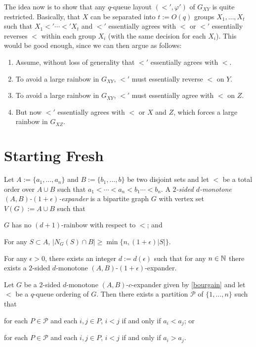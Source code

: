 \documentclass{patmorin}
\begin{document}
The idea now is to show that any $q$-queue layout $(<',\varphi')$ of $G_{XY}$ is quite restricted.  Basically, that $X$ can be separated into $t:=O(q)$ groups $X_1,\ldots,X_t$ such that $X_1<'\cdots<'X_t$ and $<'$ essentially agrees with $<$ or $<'$ essentially reverses $<$ within each group $X_i$ (with the same decision for each $X_i$).  This would be good enough, since we can then argue as follows:
\begin{enumerate}
   \item Assume, without loss of generality that $<'$ essentially agrees with $<$.
   \item To avoid a large rainbow in $G_{XY}$, $<'$ must essentially reverse $<$ on $Y$.
   \item To avoid a large rainbow in $G_{XY}$, $<'$ must essentially agree with $<$ on $Z$.
   \item But now $<'$ essentially agrees with $<$ or $X$ and $Z$, which forces a large rainbow in $G_{XZ}$.
\end{enumerate}




\section{Starting Fresh}

Let $A:=\{a_1,\ldots,a_n\}$ and $B:=\{b_1,\ldots,b\}$ be two disjoint sets and let $<$ be a total order over $A\cup B$ such that $a_1<\cdots<a_n<b_1\cdots<b_n$.  A \emph{$2$-sided $d$-monotone $(A,B)$-$(1+\epsilon)$-expander} is a bipartite graph $G$ with vertex set $V(G):=A\cup B$ such that
\begin{compactenum}[(P1)]
    \item $G$ has no $(d+1)$-rainbow with respect to $<$; and
    \item For any $S\subset A$, $|N_G(S)\cap B|\ge\min\{n,(1+\epsilon)|S|\}$.
\end{compactenum}

\begin{thm}[Bourgain]\label{bourgain}
    For any $\epsilon>0$, there exists an integer $d:=d(\epsilon)$ such that for any $n\in\mathbb{N}$ there exists a $2$-sided $d$-monotone $(A,B)$-$(1+\epsilon)$-expander.
\end{thm}


\begin{lem}
    Let $G$ be a $2$-sided $d$-monotone $(A,B)$-$c$-expander given by \cref{bourgain} and let $<$ be a $q$-queue ordering of $G$. Then there exists a partition $\mathcal{P}$ of $\{1,\ldots,n\}$ such that
    \begin{compactenum}[(i)]
        \item for each $P\in\mathcal{P}$ and each $i,j\in P$, $i<j$ if and only if $a_i<a_j$; or
        \item for each $P\in\mathcal{P}$ and each $i,j\in P$, $i<j$ if and only if $a_i>a_j$.
    \end{compactenum}
\end{lem}
\end{document}
